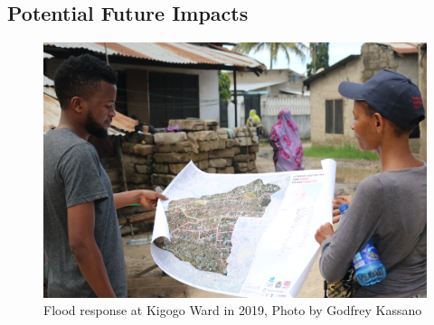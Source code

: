 \documentclass[a4paper,12pt,twoside]{article}
\begin{document}
\subsection{Potential Future Impacts}
\begin{figure}[h]
    \centering
    \includegraphics[width=.8\textwidth]{images/Wichomap.JPG}
    \caption{Flood response at Kigogo Ward in 2019, Photo by Godfrey Kassano}
\end{figure}
\end{document}
